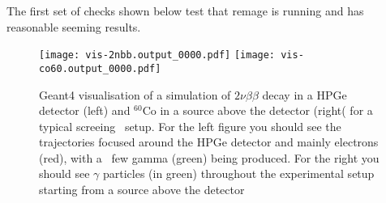 The first set of checks shown below test that remage is running and has reasonable seeming results.

\begin{figure}[h!]
    \centering
    \texttt{[image: vis-2nbb.output\_0000.pdf]}
    \texttt{[image: vis-co60.output\_0000.pdf]}

    \caption{Geant4 visualisation of a simulation of $2\nu\beta\beta$ decay in a HPGe detector (left) and $^{60}$Co in a source above the detector (right( for a typical screeing \
    setup. For the left figure you should see the trajectories focused around the HPGe detector and mainly electrons (red), with a \
    few gamma (green) being produced. For the right you should see $\gamma$ particles (in green) throughout  the experimental setup starting from a source above the detector
    }
\end{figure}
